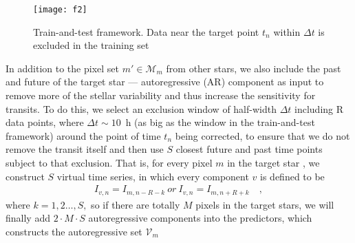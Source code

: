 \documentclass[12pt, preprint]{aastex}
\newcommand{\set}[1]{\mathcal{#1}}
\begin{document}
\begin{figure}[p]
\begin{center}
\texttt{[image: f2]}
\end{center}
\caption{
  \label{train-and-test} 
  Train-and-test framework. 
  Data near the target point $t_{n}$ within $\Delta t$ is excluded in the training set}
\end{figure}
  
In addition to the pixel set $m'\in\set{M}_m$ from other stars,  
  we also include the past and future of the target star --- autoregressive (AR) component as input 
  to remove more of the stellar variability and thus increase the sensitivity for transits. 
To do this, we select an exclusion window of half-width $\Delta t$ including R data points, 
  where $\Delta t\sim 10$\, h (as big as the window in the train-and-test framework) 
  around the point of time $t_{n}$ being corrected, 
  to ensure that we do not remove the transit itself 
  and then use $S$ closest future and past time points subject to that exclusion. 
That is, for every pixel $m$ in the target star , we construct $S$ virtual time series, 
  in which every component $v$ is defined to be     
\begin{eqnarray}
I_{v,n} = I_{m,n-R-k}\ or\ I_{v,n} = I_{m,n+R+k}
\quad,
\end{eqnarray}
where $k = 1, 2\dots, S,$ so if there are totally $M$ pixels in the target stars, 
  we will finally add $2\cdot M\cdot S$
  autoregressive components into the predictors, which constructs the autoregressive set $\set{V}_m$
\end{document}
